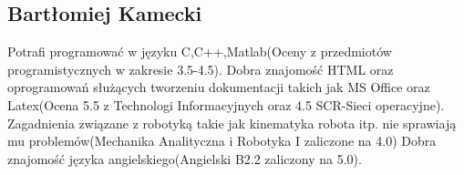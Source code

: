 \subsection{Bartłomiej Kamecki}
Potrafi programować w języku C,C++,Matlab(Oceny z przedmiotów programistycznych w zakresie 3.5-4.5). Dobra znajomość HTML oraz oprogramowań służących tworzeniu dokumentacji takich jak MS Office oraz Latex(Ocena 5.5 z Technologi Informacyjnych oraz 4.5 SCR-Sieci operacyjne). Zagadnienia związane z robotyką takie jak kinematyka robota itp. nie sprawiają mu problemów(Mechanika Analityczna i Robotyka I zaliczone na 4.0) Dobra znajomość języka angielskiego(Angielski B2.2 zaliczony na 5.0). 
